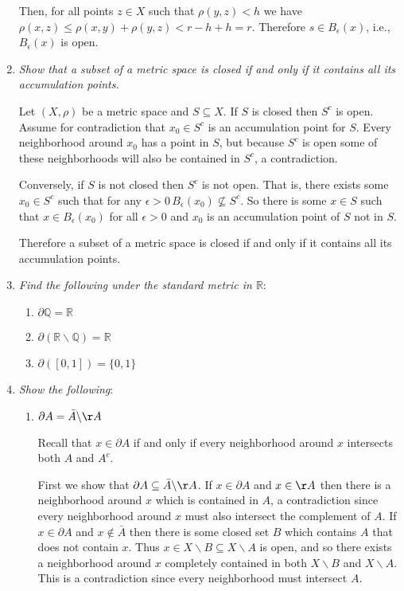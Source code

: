\documentclass[11pt]{article}
\begin{document}
\begin{enumerate}
Then, for all points $z \in X$ such that $\rho(y,z)<h$ we have $\rho(x,z) \leq \rho(x,y)+\rho(y,z) < r-h+h = r$.  Therefore $s \in B_\epsilon(x)$, i.e., $B_\epsilon(x)$ is open.

\item \emph{Show that a subset of a metric space is closed if and only if it contains all its accumulation points.}

Let $(X,\rho)$ be a metric space and $S \subseteq X$. If $S$ is closed then $S^c$ is open.  Assume for contradiction that $x_0 \in S^c$ is an accumulation point for $S$.  Every neighborhood around $x_0$ has a point in $S$, but because $S^c$ is open some of these neighborhoods will also be contained in $S^c$, a contradiction.

Conversely, if $S$ is not closed then $S^c$ is not open.  That is, there exists some $x_0 \in S^c$ such that for any $\epsilon > 0 \, B_\epsilon(x_0) \nsubseteq S^c$.  So there is some $x \in S$ such that $x \in B_\epsilon(x_0)$ for all $\epsilon > 0$ and $x_0$ is an accumulation point of $S$ not in $S$.

Therefore a subset of a metric space is closed if and only if it contains all its accumulation points.

\item \emph{Find the following under the standard metric in $\mathbb{R}$}:
\begin{enumerate}
\item $\partial\mathbb{Q} = \mathbb{R}$
\item $\partial(\mathbb{R} \backslash \mathbb{Q})=\mathbb{R}$
\item $\partial([0,1])=\{0,1\}$
\end{enumerate}

\item \emph{Show the following}:
\begin{enumerate}
\item \emph{$\partial A = \bar{A} \backslash \AA$}

Recall that $x \in \partial A$ if and only if every neighborhood around $x$ intersects both $A$ and $A^c$.

First we show that $\partial A \subseteq \bar{A} \backslash \AA$.  If $x \in \partial A$ and $x \in \AA$ then there is a neighborhood around $x$ which is contained in $A$, a contradiction since every neighborhood around $x$ must also intersect the complement of $A$.  If $x \in \partial A$ and $x \notin \bar{A}$ then there is some closed set $B$ which contains $A$ that does not contain $x$.  Thus $x \in X \backslash B \subseteq X \backslash A$ is open, and so there exists a neighborhood around $x$ completely contained in both $X \backslash B$ and $X \backslash A$.  This is a contradiction since every neighborhood must intersect $A$.


\end{enumerate}
\end{enumerate}
\end{document}
